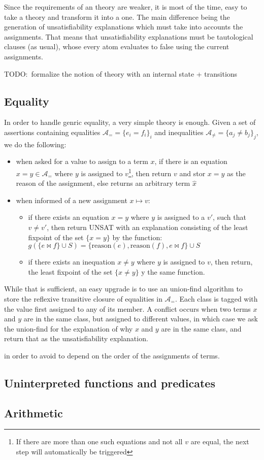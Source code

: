 \documentclass{article}
\begin{document}
Since the requirements of an \mcsat{} theory are weaker, it is most of the time, easy to
take a \smt{} theory and transform it into a \mcsat{} one. The main difference being the
generation of unsatisfiability explanations which must take into accounts the assignments.
That means that unsatisfiability explanations must be tautological clauses (as usual),
whose every atom evaluates to false using the current assignments.

TODO:~formalize the notion of theory with an internal state + transitions

\subsection{Equality}

In order to handle genric equality, a very simple theory is enough. Given a set of assertions
containing equalities $\mathcal{A}_= = \{ e_i = f_i \}_i$ and inequalities
$\mathcal{A}_\neq = \{ a_j \neq b_j \}_j$, we do the following:

\begin{itemize}
  \item when asked for a value to assign to a term $x$, if there is an equation
    $ x = y \in \mathcal{A}_=$ where $y$ is assigned to $v$\footnote{If there are
    more than one such equations and not all $v$ are equal, the next step will
    automatically be triggered}, then return $v$ and
    stor $x = y$ as the reason of the assignment, else returns an arbitrary
    term $\hat{x}$
  \item when informed of a new assignment $x \mapsto v$:
    \begin{itemize}
      \item if there exists an equation $x = y$ where $y$ is assigned to a $v'$,
        such that $v \neq v'$, then return UNSAT with an explanation consisting
        of the least fixpoint of the set $\{ x = y \}$ by the function:
        $g(\{ e \bowtie f \} \cup S) = \{ \text{reason}(e), \text{reason}(f), e \bowtie f \} \cup S$
      \item if there exists an inequation $x \neq y$ where $y$ is assigned to $v$,
        then return, the least fixpoint of the set $\{ x \neq y \}$ y the same function.
    \end{itemize}
\end{itemize}

While that is sufficient, an easy upgrade is to use an union-find algorithm to store
the reflexive transitive closure of equalities in $\mathcal{A}_=$. Each class is tagged
with the value first assigned to any of its member. A conflict occurs when two terms
$x$ and $y$ are in the same class, but assigned to different values, in which case
we ask the union-find for the explanation of why $x$ and $y$ are in the same class,
and return that as the unsatisfiability explanation.

in order to avoid
to depend on the order of the assignments of terms.


\subsection{Uninterpreted functions and predicates}

\subsection{Arithmetic}





\clearpage
\appendix
\end{document}

